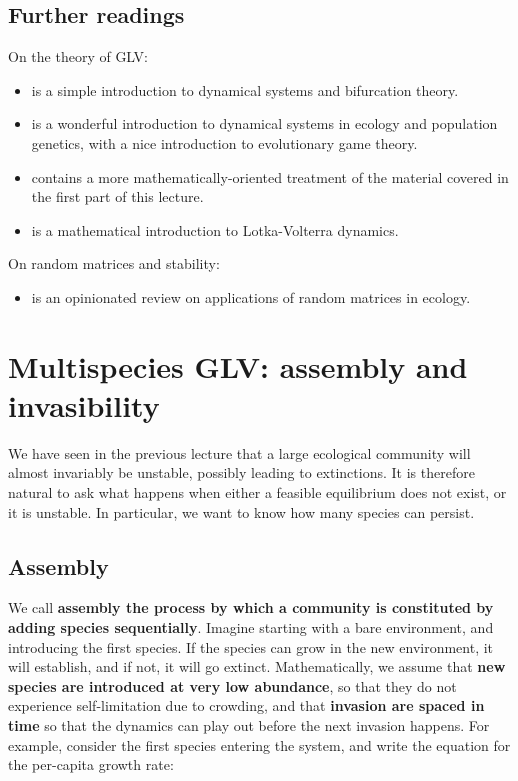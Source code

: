 \documentclass[
]{book}
\providecommand{\tightlist}{%
  \setlength{\itemsep}{0pt}\setlength{\parskip}{0pt}}
\begin{document}
\hypertarget{further-readings}{%
\section{Further readings}\label{further-readings}}

On the theory of GLV:

\begin{itemize}
\item
  \citet{strogatz2018nonlinear} is a simple introduction to dynamical systems and bifurcation theory.
\item
  \citet{hofbauer1998evolutionary} is a wonderful introduction to dynamical systems in ecology and population genetics, with a nice introduction to evolutionary game theory.
\item
  \citet{hadeler2017topics} contains a more mathematically-oriented treatment of the material covered in the first part of this lecture.
\item
  \citet{baigent2016lotka} is a mathematical introduction to Lotka-Volterra dynamics.
\end{itemize}

On random matrices and stability:

\begin{itemize}
\tightlist
\item
  \citet{allesina2015stability} is an opinionated review on applications of random matrices in ecology.
\end{itemize}

\hypertarget{multi}{%
\chapter{Multispecies GLV: assembly and invasibility}\label{multi}}

We have seen in the previous lecture that a large ecological community will almost invariably be unstable, possibly leading to extinctions. It is therefore natural to ask what happens when either a feasible equilibrium does not exist, or it is unstable. In particular, we want to know how many species can persist.

\hypertarget{assembly}{%
\section{Assembly}\label{assembly}}

We call \textbf{assembly the process by which a community is constituted by adding species sequentially}. Imagine starting with a bare environment, and introducing the first species. If the species can grow in the new environment, it will establish, and if not, it will go extinct. Mathematically, we assume that \textbf{new species are introduced at very low abundance}, so that they do not experience self-limitation due to crowding, and that \textbf{invasion are spaced in time} so that the dynamics can play out before the next invasion happens. For example, consider the first species entering the system, and write the equation for the per-capita growth rate:
\end{document}
